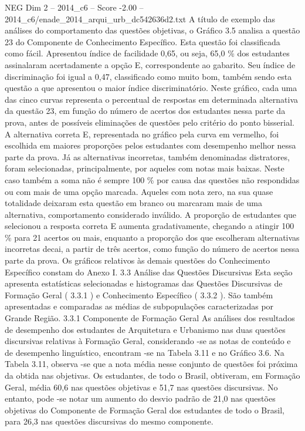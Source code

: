 \begin{textsample}{NEG Dim 2 – 2014\_c6 – Score -2.00 – 2014\_c6/enade\_2014\_arqui\_urb\_dc542636d2.txt}
A título de exemplo das análises do comportamento das questões objetivas, o Gráfico 3.5 analisa a questão 23 do Componente de Conhecimento Específico.
Esta questão foi classificada como fácil.
Apresentou índice de facilidade 0,65, ou seja, 65,0 \% dos estudantes assinalaram acertadamente a opção E, correspondente ao gabarito.
Seu índice de discriminação foi igual a 0,47, classificado como muito bom, também sendo esta questão a que apresentou o maior índice discriminatório.
Neste gráfico, cada uma das cinco curvas representa o percentual de respostas em determinada alternativa da questão 23, em função do número de acertos dos estudantes nessa parte da prova, antes de possíveis eliminações de questões pelo critério do ponto bisserial.
A alternativa correta E, representada no gráfico pela curva em vermelho, foi escolhida em maiores proporções pelos estudantes com desempenho melhor nessa parte da prova.
Já as alternativas incorretas, também denominadas distratores, foram selecionadas, principalmente, por aqueles com notas mais baixas.
Neste caso também a soma não é sempre 100 \% por causa das questões não respondidas ou com mais de uma opção marcada.
Aqueles com nota zero, na sua quase totalidade deixaram esta questão em branco ou marcaram mais de uma alternativa, comportamento considerado inválido.
A proporção de estudantes que selecionou a resposta correta E aumenta gradativamente, chegando a atingir 100 \% para 21 acertos ou mais, enquanto a proporção dos que escolheram alternativas incorretas decai, a partir de três acertos, como função do número de acertos nessa parte da prova.
Os gráficos relativos às demais questões do Conhecimento Específico constam do Anexo I. 3.3 Análise das Questões Discursivas Esta seção apresenta estatísticas selecionadas e histogramas das Questões Discursivas de Formação Geral ( 3.3.1 ) e Conhecimento Específico ( 3.3.2 ).
São também apresentadas e comparadas as médias de subpopulações caracterizadas por Grande Região. 3.3.1 Componente de Formação Geral As análises dos resultados de desempenho dos estudantes de Arquitetura e Urbanismo nas duas questões discursivas relativas à Formação Geral, considerando -se as notas de conteúdo e de desempenho linguístico, encontram -se na Tabela 3.11 e no Gráfico 3.6.
Na Tabela 3.11, observa -se que a nota média nesse conjunto de questões foi próxima da obtida nas objetivas.
Os estudantes, de todo o Brasil, obtiveram, em Formação Geral, média 60,6 nas questões objetivas e 51,7 nas questões discursivas.
No entanto, pode -se notar um aumento do desvio padrão de 21,0 nas questões objetivas do Componente de Formação Geral dos estudantes de todo o Brasil, para 26,3 nas questões discursivas do mesmo componente.

\end{textsample}
